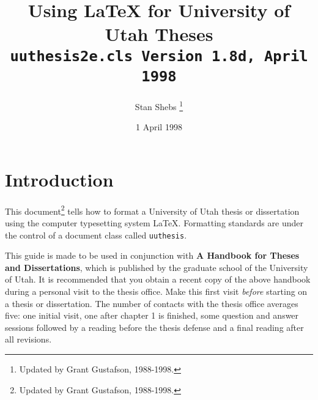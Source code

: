 %

\setlength{\oddsidemargin}{0in}
\setlength{\evensidemargin}{0in}
\setlength{\textwidth}{6.4in}
\setlength{\parskip}{5pt}
\setlength{\parindent}{0pt}
\date{1 April 1998}

\title{Using \LaTeX{} for University of Utah Theses \\
       {\large \tt uuthesis2e.cls Version 1.8d, April 1998}}
\author{Stan Shebs
\footnote{Updated by Grant Gustafson, 1988-1998.}
}



\maketitle

\section{Introduction}
This document\footnote{Updated by Grant Gustafson, 1988-1998.}
tells how to format a University of Utah thesis or
dissertation using the computer typesetting system \LaTeX. Formatting
standards are
under the control of a document class called \verb|uuthesis|.

This guide is made to be used in conjunction with
{\bf A Handbook for Theses and Dissertations}, which is
published by the graduate school of the University of Utah. It is
recommended that you obtain a recent copy of the above handbook during a
personal visit to the thesis office. Make this first visit {\em before}
starting on a thesis or dissertation. The number of contacts with the
thesis office averages five: one initial visit, one after chapter 1 is
finished, some question and answer sessions followed by a reading before
the thesis defense and a final reading after all revisions.

